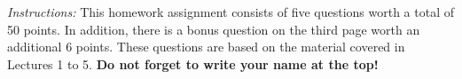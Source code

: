 

\oddsidemargin 0in
\evensidemargin 0in
\textwidth 6.5in
\topmargin -0.5in
\textheight 9.0in

\usepackage{hyperref}
\usepackage{float}
\usepackage{pdfpages}
\usepackage{textcomp}
\usepackage{mathtools}
\usepackage{algorithm}
\usepackage{array}
\usepackage{tabu}
\usepackage{changepage}
\usepackage{amsmath}
\usepackage{amssymb}
\usepackage{lscape}
\usepackage{tikz}
\usetikzlibrary{trees}

\usepackage[noend]{algpseudocode}
\usepackage{graphicx,url,epstopdf}
\usepackage{xcolor}
\makeatletter
\def\BState{\State\hskip-\ALG@thistlm}
\makeatother
\sloppy
\usepackage{colortbl}




\newcommand\tab[1][1cm]{\hspace*{#1}}




\pagestyle{myheadings}  %

\noindent\emph{Instructions:} This homework assignment consists of five questions worth a total of 50 points. 
In addition, there is a bonus question on the third page worth an additional 6 points.
These questions are based on the material covered in Lectures 1 to 5.
\textbf{Do not forget to write your name at the top!}

